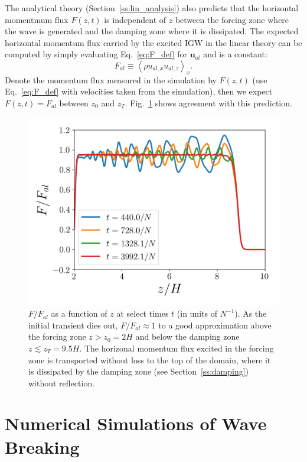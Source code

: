 \documentclass[
        fleqn,
        usenatbib,
        referee,
    ]{mnras}
\newcommand*{\ev}[1]{\left\langle#1\right\rangle}
\newcommand*{\bm}[1]{\mathbf{#1}}
\begin{document}
The analytical theory (Section~\ref{ss:lin_analysis}) also predicts that the
horizontal momentmum flux $F(z, t)$ is independent of $z$ between the forcing
zone where the wave is generated and the damping zone where it is dissipated.
The expected horizontal momentum flux carried by the excited IGW in the linear
theory can be computed by simply evaluating Eq.~\eqref{eq:F_def} for
$\bm{u}_{al}$ and is a constant:
\begin{equation}
    F_{al} \equiv \ev{\rho u_{al, x} u_{al, z}}_x.\label{eq:F_al}
\end{equation}
Denote the momentum flux measured in the simulation by $F(z, t)$
(use Eq.~\eqref{eq:F_def} with velocities taken from the simulation), then we
expect $F(z, t) = F_{al}$ between $z_0$ and $z_T$. Fig.~\ref{fig:lin_fluxes}
shows agreement with this prediction.
\begin{figure}
    \centering
    \includegraphics[width=0.9\columnwidth]{plots/lin_fluxes.png}
    \caption{$F/F_{al}$ as a function of $z$ at select times $t$ (in units of
    $N^{-1}$). As the initial transient dies out, $F / F_{al} \approx 1$ to a
    good approximation above the forcing zone $z > z_0 = 2H$ and below the
    damping zone $z \lesssim z_T = 9.5H$. The horizonal momentum flux excited in
    the forcing zone is transported without loss to the top of the domain, where
    it is dissipated by the damping zone (see Section~\ref{ss:damping}) without
    reflection.}\label{fig:lin_fluxes}
\end{figure}


\section{Numerical Simulations of Wave Breaking}\label{s:sim}
\end{document}
